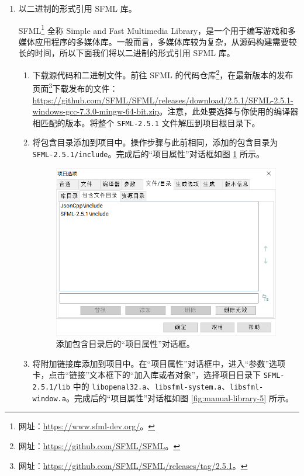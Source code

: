 \begin{enumerate}
	\item 以二进制的形式引用 SFML 库。\label{item:exp-2-3}

	SFML\footnote{网址：\url{https://www.sfml-dev.org/}。} 全称 Simple and Fast Multimedia Library，是一个用于编写游戏和多媒体应用程序的多媒体库。一般而言，多媒体库较为复杂，从源码构建需要较长的时间，所以下面我们将以二进制的形式引用 SFML 库。

	\begin{enumerate}
		\item 下载源代码和二进制文件。前往 SFML 的代码仓库\footnote{网址：\url{https://github.com/SFML/SFML}。}，在最新版本的发布页面\footnote{网址：\url{https://github.com/SFML/SFML/releases/tag/2.5.1}。}下载发布的文件：\url{https://github.com/SFML/SFML/releases/download/2.5.1/SFML-2.5.1-windows-gcc-7.3.0-mingw-64-bit.zip}。注意，此处要选择与你使用的编译器相匹配的版本。将整个 \lstinline[language={}]{SFML-2.5.1} 文件解压到项目根目录下。

		\item 将包含目录添加到项目中。操作步骤与此前相同，添加的包含目录为 \lstinline[language={}]{SFML-2.5.1/include}。完成后的“项目属性”对话框如图 \ref{fig:manual-library-4} 所示。

		\begin{figure}[p]
			\centering
			\includegraphics[width=0.75\linewidth]{assets/manual-library-4}
			\caption{添加包含目录后的“项目属性”对话框。}
			\label{fig:manual-library-4}
		\end{figure}

		\item 将附加链接库添加到项目中。\label{item:exp-2-3-3}在“项目属性”对话框中，进入“参数”选项卡，点击“链接”文本框下的“加入库或者对象”，选择项目目录下 \lstinline[language={}]{SFML-2.5.1/lib} 中的 \lstinline[language={}]{libopenal32.a}、\lstinline[language={}]{libsfml-system.a}、\lstinline[language={}]{libsfml-window.a}。完成后的“项目属性”对话框如图 \ref{fig:manual-library-5} 所示。


\end{enumerate}
\end{enumerate}
